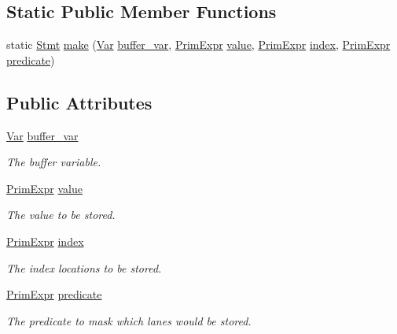 \subsection*{Static Public Member Functions}
\begin{DoxyCompactItemize}
\item 
static \hyperlink{classtvm_1_1tir_1_1Stmt}{Stmt} \hyperlink{classtvm_1_1tir_1_1StoreNode_a1fb4127cab1ae4efa7c630651f60c768}{make} (\hyperlink{classtvm_1_1tir_1_1Var}{Var} \hyperlink{classtvm_1_1tir_1_1StoreNode_aed2fc3d3c119126a61182666930e8729}{buffer\+\_\+var}, \hyperlink{classtvm_1_1PrimExpr}{Prim\+Expr} \hyperlink{classtvm_1_1tir_1_1StoreNode_ab263339a5ca3f30c5be6498f3db67bc0}{value}, \hyperlink{classtvm_1_1PrimExpr}{Prim\+Expr} \hyperlink{classtvm_1_1tir_1_1StoreNode_adb01cdfb84c4b715cb817dcf49118557}{index}, \hyperlink{classtvm_1_1PrimExpr}{Prim\+Expr} \hyperlink{classtvm_1_1tir_1_1StoreNode_a1f4b2a87017d5c8ff41f79701d91f99a}{predicate})
\end{DoxyCompactItemize}
\subsection*{Public Attributes}
\begin{DoxyCompactItemize}
\item 
\hyperlink{classtvm_1_1tir_1_1Var}{Var} \hyperlink{classtvm_1_1tir_1_1StoreNode_aed2fc3d3c119126a61182666930e8729}{buffer\+\_\+var}
\begin{DoxyCompactList}\small\item\em The buffer variable. \end{DoxyCompactList}\item 
\hyperlink{classtvm_1_1PrimExpr}{Prim\+Expr} \hyperlink{classtvm_1_1tir_1_1StoreNode_ab263339a5ca3f30c5be6498f3db67bc0}{value}
\begin{DoxyCompactList}\small\item\em The value to be stored. \end{DoxyCompactList}\item 
\hyperlink{classtvm_1_1PrimExpr}{Prim\+Expr} \hyperlink{classtvm_1_1tir_1_1StoreNode_adb01cdfb84c4b715cb817dcf49118557}{index}
\begin{DoxyCompactList}\small\item\em The index locations to be stored. \end{DoxyCompactList}\item 
\hyperlink{classtvm_1_1PrimExpr}{Prim\+Expr} \hyperlink{classtvm_1_1tir_1_1StoreNode_a1f4b2a87017d5c8ff41f79701d91f99a}{predicate}
\begin{DoxyCompactList}\small\item\em The predicate to mask which lanes would be stored. \end{DoxyCompactList}\end{DoxyCompactItemize}
